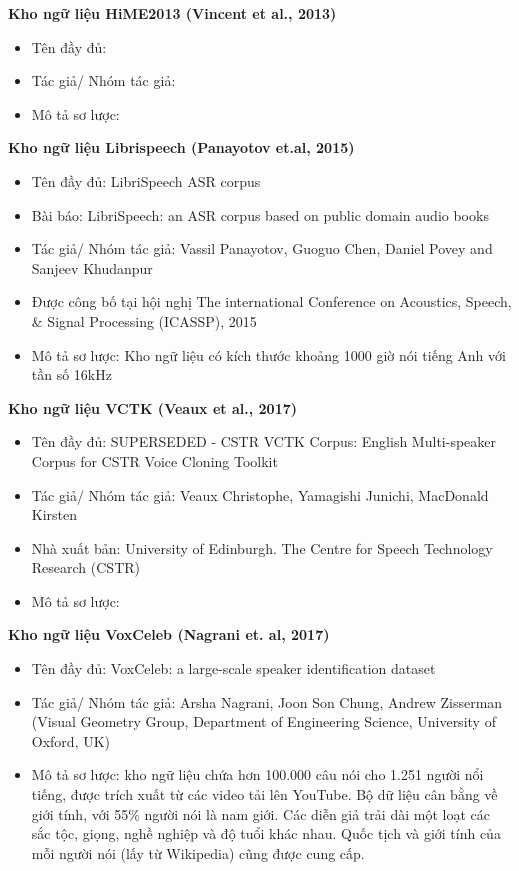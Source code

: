 \documentclass{article}
\begin{document}
	\textbf{Kho ngữ liệu HiME2013 (Vincent et al., 2013)}
	\begin{itemize}
		\item Tên đầy đủ:
		\item Tác giả/ Nhóm tác giả:
		\item Mô tả sơ lược:
	\end{itemize}
	\textbf{Kho ngữ liệu Librispeech (Panayotov et.al, 2015)}
	\begin{itemize}
		\item Tên đầy đủ: LibriSpeech ASR corpus
		\item Bài báo: LibriSpeech: an ASR corpus based on public domain audio books
		\item Tác giả/ Nhóm tác giả: Vassil Panayotov, Guoguo Chen, Daniel Povey and Sanjeev Khudanpur
		\item Được công bố tại hội nghị The international Conference on Acoustics, Speech, \& Signal Processing (ICASSP), 2015
		\item Mô tả sơ lược: Kho ngữ liệu có kích thước khoảng 1000 giờ nói tiếng Anh với tần số 16kHz
	\end{itemize}	
	\textbf{Kho ngữ liệu VCTK (Veaux et al., 2017)}
	\begin{itemize}
		\item Tên đầy đủ: SUPERSEDED - CSTR VCTK Corpus: English Multi-speaker Corpus for CSTR Voice Cloning Toolkit
		\item Tác giả/ Nhóm tác giả: Veaux Christophe, Yamagishi Junichi, MacDonald Kirsten
		\item Nhà xuất bản: University of Edinburgh. The Centre for Speech Technology Research (CSTR)
		\item Mô tả sơ lược:
	\end{itemize}
	\textbf{Kho ngữ liệu VoxCeleb (Nagrani et. al, 2017)}
	\begin{itemize}
		\item Tên đầy đủ: VoxCeleb: a large-scale speaker identification dataset
		\item Tác giả/ Nhóm tác giả: Arsha Nagrani, Joon Son Chung, Andrew Zisserman (Visual Geometry Group, Department of Engineering Science, University of Oxford, UK)
		\item Mô tả sơ lược: kho ngữ liệu chứa hơn 100.000 câu nói cho 1.251 người nổi tiếng, được trích xuất từ các video tải lên YouTube. Bộ dữ liệu cân bằng về giới tính, với 55\% người nói là nam giới. Các diễn giả trải dài một loạt các sắc tộc, giọng, nghề nghiệp và độ tuổi khác nhau. Quốc tịch và giới tính của mỗi người nói (lấy từ Wikipedia) cũng được cung cấp.
	\end{itemize}
\end{document}
